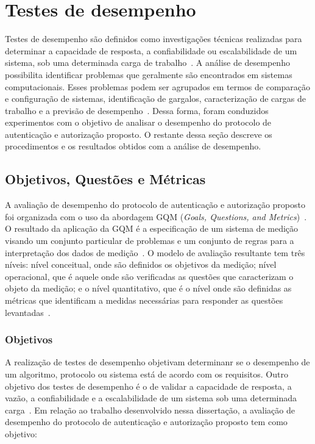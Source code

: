 \section{Testes de desempenho}

Testes de desempenho são definidos como investiga\c c\~{o}es técnicas realizadas 
para determinar a capacidade de resposta, a confiabilidade ou escalabilidade de um sistema, 
sob uma determinada carga de trabalho~\cite{Meier2007}.
A análise de desempenho possibilita identificar problemas que geralmente são encontrados em sistemas computacionais. 
Esses problemas podem ser agrupados em termos de comparação e configuração de sistemas, identificação de gargalos, 
caracterização de cargas de trabalho e a previsão de desempenho~\cite{jain1991art}. Dessa forma, foram conduzidos 
experimentos com o objetivo de analisar o desempenho do protocolo de autenticação e autorização proposto. O restante 
dessa se\c c\~{a}o descreve os procedimentos e os resultados obtidos com a an\'{a}lise de desempenho. 
 
\subsection{Objetivos, Questões e Métricas}\label{sec:gqm}

A avaliação de desempenho do protocolo de autenticação e autorização proposto foi organizada com o uso da abordagem 
GQM (\emph{Goals, Questions, and Metrics})~\cite{gqm}. O resultado da aplicação da GQM é a especificação de um sistema de 
medição visando um conjunto particular de problemas e um conjunto de regras para a interpretação dos dados de medição~\cite{gqm}.  
O modelo de avaliação resultante tem três níveis: nível conceitual, onde  são definidos os objetivos da medição; nível operacional, que é aquele 
onde são verificadas as questões  que caracterizam o objeto da medição; e o nível quantitativo, que é o nível onde são definidas as métricas que 
identificam a medidas necessárias para responder as questões levantadas~\cite{gqm}. 

\subsubsection{Objetivos }\label{sec:gqmobjetivos}

A realização de testes de desempenho objetivam determinanr  se o desempenho de um algoritmo, protocolo ou sistema está de acordo com os requisitos. 
Outro objetivo dos testes de desempenho é o de validar a capacidade de resposta, a vazão, a confiabilidade e a escalabilidade de um sistema sob 
uma determinada carga~\cite{Meier2007}. Em rela\c c\~{a}o ao trabalho desenvolvido nessa disserta\c c\~{a}o, 
a avaliação de desempenho do protocolo de autenticação e autorização proposto tem como objetivo:

